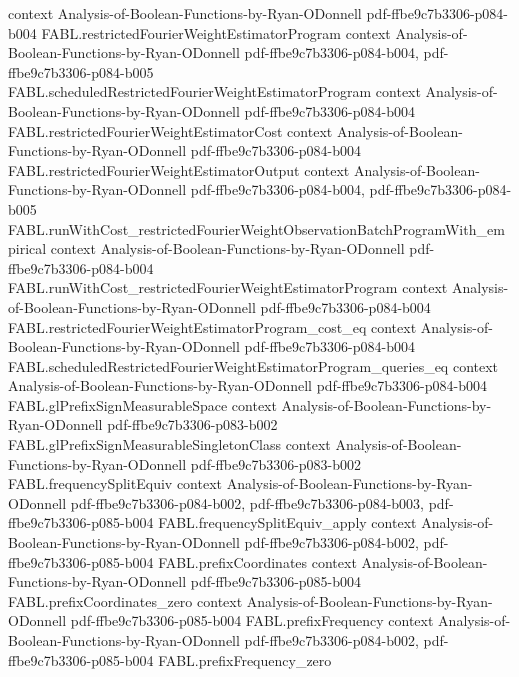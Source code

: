 \begin{theorem}
  {context}
  {Analysis-of-Boolean-Functions-by-Ryan-ODonnell}
  {pdf-ffbe9c7b3306-p084-b004}
\proofstep
  {FABL.restrictedFourierWeightEstimatorProgram}
  {context}
  {Analysis-of-Boolean-Functions-by-Ryan-ODonnell}
  {pdf-ffbe9c7b3306-p084-b004,
    pdf-ffbe9c7b3306-p084-b005}
\proofstep
  {FABL.scheduledRestrictedFourierWeightEstimatorProgram}
  {context}
  {Analysis-of-Boolean-Functions-by-Ryan-ODonnell}
  {pdf-ffbe9c7b3306-p084-b004}
\proofstep
  {FABL.restrictedFourierWeightEstimatorCost}
  {context}
  {Analysis-of-Boolean-Functions-by-Ryan-ODonnell}
  {pdf-ffbe9c7b3306-p084-b004}
\proofstep
  {FABL.restrictedFourierWeightEstimatorOutput}
  {context}
  {Analysis-of-Boolean-Functions-by-Ryan-ODonnell}
  {pdf-ffbe9c7b3306-p084-b004,
    pdf-ffbe9c7b3306-p084-b005}
\proofstep
  {FABL.runWithCost_restrictedFourierWeightObservationBatchProgramWith_empirical}
  {context}
  {Analysis-of-Boolean-Functions-by-Ryan-ODonnell}
  {pdf-ffbe9c7b3306-p084-b004}
\proofstep
  {FABL.runWithCost_restrictedFourierWeightEstimatorProgram}
  {context}
  {Analysis-of-Boolean-Functions-by-Ryan-ODonnell}
  {pdf-ffbe9c7b3306-p084-b004}
\proofstep
  {FABL.restrictedFourierWeightEstimatorProgram_cost_eq}
  {context}
  {Analysis-of-Boolean-Functions-by-Ryan-ODonnell}
  {pdf-ffbe9c7b3306-p084-b004}
\proofstep
  {FABL.scheduledRestrictedFourierWeightEstimatorProgram_queries_eq}
  {context}
  {Analysis-of-Boolean-Functions-by-Ryan-ODonnell}
  {pdf-ffbe9c7b3306-p084-b004}
\proofstep
  {FABL.glPrefixSignMeasurableSpace}
  {context}
  {Analysis-of-Boolean-Functions-by-Ryan-ODonnell}
  {pdf-ffbe9c7b3306-p083-b002}
\proofstep
  {FABL.glPrefixSignMeasurableSingletonClass}
  {context}
  {Analysis-of-Boolean-Functions-by-Ryan-ODonnell}
  {pdf-ffbe9c7b3306-p083-b002}
\proofstep
  {FABL.frequencySplitEquiv}
  {context}
  {Analysis-of-Boolean-Functions-by-Ryan-ODonnell}
  {pdf-ffbe9c7b3306-p084-b002,
    pdf-ffbe9c7b3306-p084-b003,
    pdf-ffbe9c7b3306-p085-b004}
\proofstep
  {FABL.frequencySplitEquiv_apply}
  {context}
  {Analysis-of-Boolean-Functions-by-Ryan-ODonnell}
  {pdf-ffbe9c7b3306-p084-b002,
    pdf-ffbe9c7b3306-p085-b004}
\proofstep
  {FABL.prefixCoordinates}
  {context}
  {Analysis-of-Boolean-Functions-by-Ryan-ODonnell}
  {pdf-ffbe9c7b3306-p085-b004}
\proofstep
  {FABL.prefixCoordinates_zero}
  {context}
  {Analysis-of-Boolean-Functions-by-Ryan-ODonnell}
  {pdf-ffbe9c7b3306-p085-b004}
\proofstep
  {FABL.prefixFrequency}
  {context}
  {Analysis-of-Boolean-Functions-by-Ryan-ODonnell}
  {pdf-ffbe9c7b3306-p084-b002,
    pdf-ffbe9c7b3306-p085-b004}
\proofstep
  {FABL.prefixFrequency_zero}

\end{theorem}
